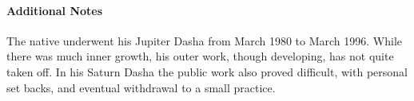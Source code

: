  

\paragraph{Additional Notes}

 

The native underwent his Jupiter Dasha from March 1980 to March 1996. While there was much inner growth, his outer work, though developing, has not quite taken off. In his Saturn Dasha the public work also proved difficult, with personal set backs, and eventual withdrawal to a small practice.

